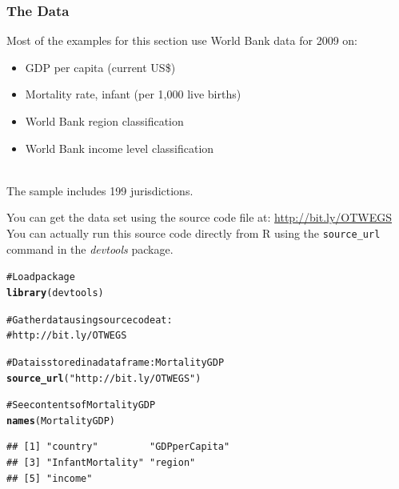 \documentclass{beamer}\usepackage{graphicx, color}
\makeatletter
\newcommand{\hlfunctioncall}[1]{\textcolor[rgb]{0.501960784313725,0,0.329411764705882}{\textbf{#1}}}%
\newcommand{\hlstring}[1]{\textcolor[rgb]{0.6,0.6,1}{#1}}%
\newcommand{\hlcomment}[1]{\textcolor[rgb]{0.180392156862745,0.6,0.341176470588235}{#1}}%
\newenvironment{kframe}{%
 \def\at@end@of@kframe{}%
 \ifinner\ifhmode%
  \def\at@end@of@kframe{\end{minipage}}%
  \begin{minipage}{\columnwidth}%
 \fi\fi%
 \def\FrameCommand##1{\hskip\@totalleftmargin \hskip-\fboxsep
 \colorbox{shadecolor}{##1}\hskip-\fboxsep
     \hskip-\linewidth \hskip-\@totalleftmargin \hskip\columnwidth}%
 \MakeFramed {\advance\hsize-\width
   \@totalleftmargin\z@ \linewidth\hsize
   \@setminipage}}%
 {\par\unskip\endMakeFramed%
 \at@end@of@kframe}
\newenvironment{knitrout}{}{} %
\makeatother
\begin{document}

\begin{frame}[fragile]
  \frametitle{The Data}
  Most of the examples for this section use World Bank data for 2009 on:
  \begin{itemize}
    \item GDP per capita (current US\$)
    \item Mortality rate, infant (per 1,000 live births)
    \item World Bank region classification
    \item World Bank income level classification
  \end{itemize} \\[0.3cm]
  The sample includes 199 jurisdictions.
\end{frame}

\begin{frame}[fragile]
  You can get the data set using the source code file at: \url{http://bit.ly/OTWEGS} \\[0.5cm]
  You can actually run this source code directly from R using the \texttt{source\_url} command in the {\emph{devtools}} package.
\end{frame}

\begin{frame}[fragile]
\begin{knitrout}
\color{fgcolor}\begin{kframe}
\begin{alltt}
\hlcomment{# Load package}
\hlfunctioncall{library}(devtools)

\hlcomment{# Gather data using source code at:}
\hlcomment{# http://bit.ly/OTWEGS}

\hlcomment{# Data is stored in a data frame: MortalityGDP}
\hlfunctioncall{source_url}(\hlstring{"http://bit.ly/OTWEGS"})

\hlcomment{# See contents of MortalityGDP}
\hlfunctioncall{names}(MortalityGDP)
\end{alltt}
\begin{verbatim}
## [1] "country"         "GDPperCapita"   
## [3] "InfantMortality" "region"         
## [5] "income"
\end{verbatim}
\end{kframe}
\end{knitrout}

\end{frame}
\end{document}
